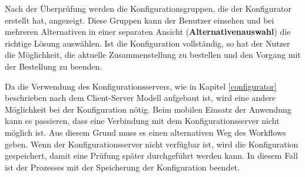 Nach der Überprüfung werden die  Konfigurationsgruppen, die der Konfigurator erstellt hat, angezeigt. Diese Gruppen kann der Benutzer einsehen und bei mehreren Alternativen in einer 
separaten Ansicht (\textbf{Alternativenauswahl}) die richtige Lösung auswählen. Ist die Konfiguration vollständig, so hat der Nutzer die Möglichkeit, die aktuelle Zusammenstellung zu bestellen und den Vorgang mit der Bestellung zu beenden. 

Da die Verwendung des Konfigurationsservers, wie in Kapitel \ref{configurator} beschrieben nach dem Client-Server Modell aufgebaut ist, wird eine andere Möglichkeit bei der Konfiguration nötig. Beim mobilen Einsatz der Anwendung kann es passieren, dass eine Verbindung mit dem Konfigurationsserver nicht möglich ist. Aus diesem Grund muss es einen alternativen Weg des Workflows geben. Wenn der Konfigurationsserver nicht verfügbar ist, wird die Konfiguration gespeichert, damit eine Prüfung später durchgeführt werden kann. In diesem Fall ist der Prozesses mit der Speicherung der Konfiguration beendet.

